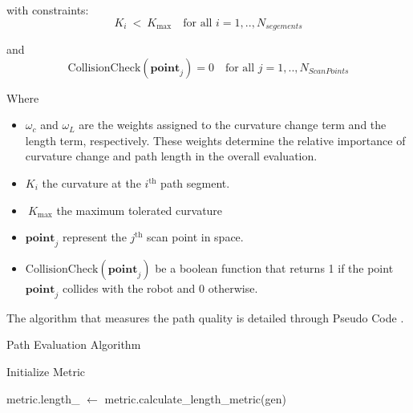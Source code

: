 \noindent
with constraints: \[K_i\ <\ K_{\max} \quad \text{for all }  i=1,.., N_{segements}\]
\noindent

and \[\text{CollisionCheck}(\mathbf{point}_j) = 0 \quad \text{for all } j=1,..,N_{ScanPoints}\]


Where \begin{itemize}
    \item \(\omega_c\) and \(\omega_L\) are the weights assigned to the curvature change term and the length term, 
    respectively. These weights determine the relative importance of curvature change and path length in the overall 
    evaluation. 
    \item \(K_i\) the curvature at the \(i^{\mathrm{th}}\) path segment.
    \item \(\ K_{\max}\) the maximum tolerated curvature
    \item \( \mathbf{point}_j \) represent the \( j^{\mathrm{th}} \) scan point in space. 

    \item \( \text{CollisionCheck}(\mathbf{point}_j) \) be a boolean function that returns 1 if the point \( \mathbf{point}_j \) 
    collides with the robot and 0 otherwise.
    
\end{itemize}


The algorithm that measures the path quality is detailed through Pseudo Code .

\begin{algorithm}[H]
    \caption{Path Evaluation Algorithm}\label{EvaluationAlgorithm}

    \SetAlgoLined
    
    Initialize Metric\;
    
    
    metric.length\_ $\gets$ metric.calculate\_length\_metric(gen)\;
    
    
    \;
\end{algorithm}

